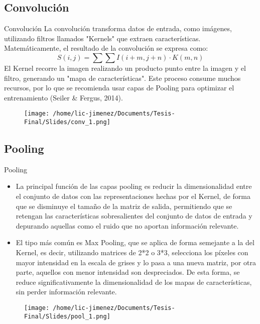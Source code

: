 \documentclass{beamer}
\begin{document}
\subsection{Convolución}
\begin{frame}{Convolución}
    La convolución transforma datos de entrada, como imágenes, utilizando filtros llamados "Kernels" que extraen características. Matemáticamente, el resultado de la convolución se expresa como:
    \[
        S(i,j) = \sum\sum I(i + m, j + n) \cdot K(m, n)
    \]
    El Kernel recorre la imagen realizando un producto punto entre la imagen y el filtro, generando un "mapa de características". Este proceso consume muchos recursos, por lo que se recomienda usar capas de Pooling para optimizar el entrenamiento (Seiler \& Fergus, 2014).
    \begin{figure}
        \centering
        \texttt{[image: /home/lic-jimenez/Documents/Tesis-Final/Slides/conv\_1.png]}
        
    \end{figure}
\end{frame}



\subsection{Pooling}
\begin{frame}{Pooling}
    \begin{itemize}
        \item La principal función de las capas pooling es reducir la dimensionalidad entre el conjunto de datos con las representaciones hechas por el Kernel, de forma que se disminuye el tamaño de la matriz de salida, permitiendo que se retengan las características sobresalientes del conjunto de datos de entrada y depurando aquellas como el ruido que no aportan información relevante.   
        \item El tipo más común es Max Pooling, que se aplica de forma semejante a la del Kernel, es decir, utilizando matrices de 2*2 o 3*3, selecciona los píxeles con mayor intensidad en la escala de grises y lo pasa a una nueva matriz, por otra parte, aquellos con menor intensidad son despreciados. De esta forma, se reduce significativamente la dimensionalidad de los mapas de características, sin perder información relevante.     
    \end{itemize}

    \begin{figure}
        \centering
        \texttt{[image: /home/lic-jimenez/Documents/Tesis-Final/Slides/pool\_1.png]}
    \end{figure}
\end{frame}
\end{document}
